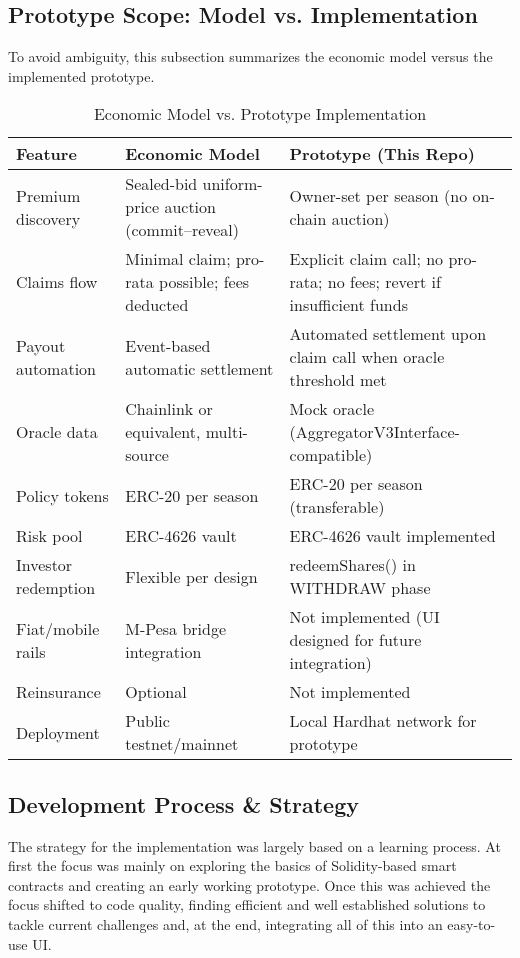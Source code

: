 \documentclass[11pt,a4paper]{article}
\begin{document}
		\subsection{Prototype Scope: Model vs. Implementation}\label{subsec:model-vs-prototype}
		To avoid ambiguity, this subsection summarizes the economic model versus the implemented prototype.
		\begin{table}[htbp]
		\centering
		\caption{Economic Model vs. Prototype Implementation}
		\label{tab:model-vs-prototype}
		\begin{tabular}{|>{\raggedright\arraybackslash}p{}|>{\raggedright\arraybackslash}p{}|>{\raggedright\arraybackslash}p{}|}
		\hline
		\textbf{Feature} & \textbf{Economic Model} & \textbf{Prototype (This Repo)} \\
		\hline
		Premium discovery & Sealed-bid uniform-price auction (commit--reveal) & Owner-set per season (no on-chain auction) \\
		\hline
		Claims flow & Minimal claim; pro-rata possible; fees deducted & Explicit claim call; no pro-rata; no fees; revert if insufficient funds \\
		\hline
		Payout automation & Event-based automatic settlement & Automated settlement upon claim call when oracle threshold met \\
		\hline
		Oracle data & Chainlink or equivalent, multi-source & Mock oracle (AggregatorV3Interface-compatible) \\
		\hline
		Policy tokens & ERC-20 per season & ERC-20 per season (transferable) \\
		\hline
		Risk pool & ERC-4626 vault & ERC-4626 vault implemented \\
		\hline
		Investor redemption & Flexible per design & redeemShares() in WITHDRAW phase \\
		\hline
		Fiat/mobile rails & M-Pesa bridge integration & Not implemented (UI designed for future integration) \\
		\hline
		Reinsurance & Optional & Not implemented \\
		\hline
		Deployment & Public testnet/mainnet & Local Hardhat network for prototype \\
		\hline
		\end{tabular}
		\end{table}

		\subsection{Development Process \& Strategy}\label{subsec:dev-strategy}
		The strategy for the implementation was largely based on a learning process.
		At first the focus was mainly on exploring the basics of Solidity-based smart contracts and creating an early working prototype.
		Once this was achieved the focus shifted to code quality, finding efficient and well established solutions to tackle current challenges and, at the end, integrating all of this into an easy-to-use UI.
\end{document}
